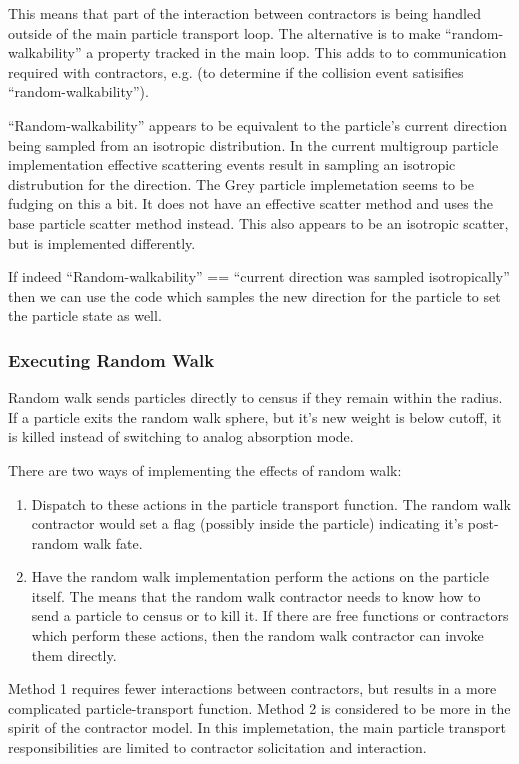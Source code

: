 \documentclass[memo]{ResearchNote}
\begin{document}
This means that part of the interaction between contractors is being
handled outside of the main particle transport loop. The alternative
is to make ``random-walkability'' a property tracked in the main
loop. This adds to to communication required with contractors, e.g. (to
determine if the collision event satisifies
``random-walkability'').

``Random-walkability'' appears to be equivalent to the particle's
current direction being sampled from an isotropic distribution. In the
current multigroup particle implementation effective scattering events
result in sampling an isotropic distrubution for the direction. The
Grey particle implemetation seems to be fudging on this a bit. It does
not have an effective scatter method and uses the base particle
scatter method instead. This also appears to be an isotropic scatter,
but is implemented differently.

If indeed ``Random-walkability'' == ``current direction was sampled
isotropically'' then we can use the code which samples the new
direction for the particle to set the particle state as well.

\subsubsection{Executing Random Walk}

Random walk sends particles directly to census if they remain within
the radius. If a particle exits the random walk sphere, but it's new
weight is below cutoff, it is killed instead of switching to analog
absorption mode. 

There are two ways of implementing the effects of random walk:
\begin{enumerate}
\item Dispatch to these actions in the particle transport function.
  The random walk contractor would set a flag (possibly inside the
  particle) indicating it's post-random walk fate.
  
\item Have the random walk implementation perform the actions on the
  particle itself. The means that the random walk contractor needs to
  know how to send a particle to census or to kill it. If there are
  free functions or contractors which perform these actions, then the
  random walk contractor can invoke them directly.
\end{enumerate}

Method 1 requires fewer interactions between contractors, but results
in a more complicated particle-transport function. Method 2 is
considered to be more in the spirit of the contractor model. In this
implemetation, the main particle transport responsibilities are
limited to contractor solicitation and interaction. 
\end{document}
